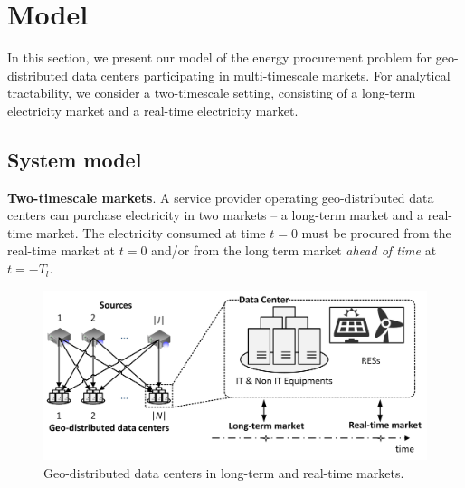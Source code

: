 \newpage
\section{Model}
\label{sec:model}

In this section, we present our model of the energy procurement problem for geo-distributed data centers participating in multi-timescale markets. For analytical tractability, we consider a two-timescale setting, consisting of a long-term electricity market and a real-time electricity market.

\subsection{System model}



\textbf{Two-timescale markets}. A service provider operating geo-distributed data centers can purchase electricity in two markets -- a long-term market and a real-time market. The electricity consumed at time $t=0$ must be procured from the real-time market at $t=0$ and/or from the long term market {\em ahead of time} at $t=-T_l$. 

\begin{figure}[!t]
	\centering
	\includegraphics[width=1.0\linewidth]{figs/MultipleDataCenter}
	\caption{Geo-distributed data centers in long-term and real-time markets.}
	\label{fig:MultipleDataCenter}
\end{figure}

